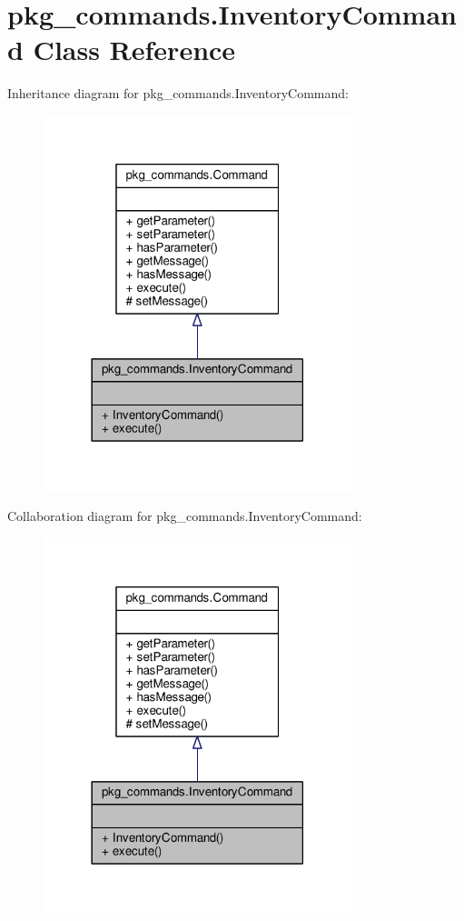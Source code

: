 \hypertarget{classpkg__commands_1_1InventoryCommand}{\section{pkg\-\_\-commands.\-Inventory\-Command Class Reference}
\label{classpkg__commands_1_1InventoryCommand}
}


Inheritance diagram for pkg\-\_\-commands.\-Inventory\-Command\-:
\nopagebreak
\begin{figure}[H]
\begin{center}
\leavevmode
\includegraphics[width=254pt]{classpkg__commands_1_1InventoryCommand__inherit__graph}
\end{center}
\end{figure}


Collaboration diagram for pkg\-\_\-commands.\-Inventory\-Command\-:
\nopagebreak
\begin{figure}[H]
\begin{center}
\leavevmode
\includegraphics[width=254pt]{classpkg__commands_1_1InventoryCommand__coll__graph}
\end{center}
\end{figure}
